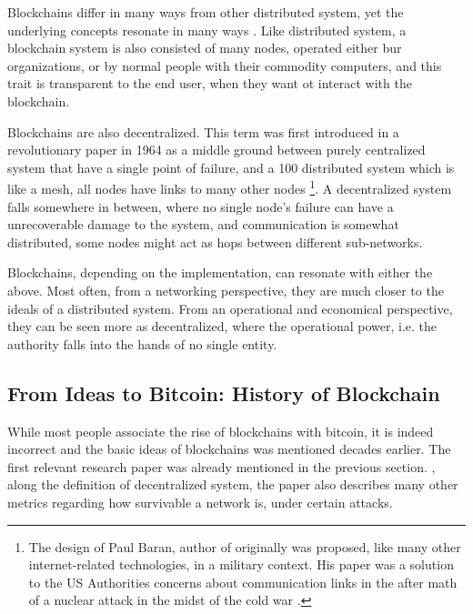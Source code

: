 Blockchains differ in many ways from other distributed system, yet the underlying concepts resonate
in many ways \cite{Herlihy_2019}. Like distributed system, a blockchain system is also consisted of
many nodes, operated either bur organizations, or by normal people with their commodity computers,
and this trait is transparent to the end user, when they want ot interact with the blockchain.

Blockchains are also decentralized. This term was first introduced in a revolutionary paper in 1964
as a middle ground between purely centralized system that have a single point of failure, and a 100%
distributed system which is like a mesh, all nodes have links to many other nodes
\cite{on_distributed_comm_networks_1964} \footnote{The design of Paul Baran, author of
\cite{on_distributed_comm_networks_1964} originally was proposed, like many other internet-related
technologies, in a military context. His paper was a solution to the US Authorities concerns about
communication links in the after math of a nuclear attack in the midst of the cold war
\cite{paul_baran_cold_war}.}. A decentralized system falls somewhere in between, where no single
node's failure can have a unrecoverable damage to the system, and communication is somewhat
distributed, some nodes might act as hops between different sub-networks.

Blockchains, depending on the implementation, can resonate with either the above. Most often, from a
networking perspective, they are much closer to the ideals of a distributed system. From an
operational and economical perspective, they can be seen more as decentralized, where the
operational power, i.e. the authority falls into the hands of no single entity.


\subsection{From Ideas to Bitcoin: History of Blockchain}

While most people associate the rise of blockchains with bitcoin, it is indeed incorrect and the
basic ideas of blockchains was mentioned decades earlier. The first relevant research paper was
already mentioned in the previous section. \cite{on_distributed_comm_networks_1964}, along the
definition of decentralized system, the paper also describes many other metrics regarding how
survivable a network is, under certain attacks.

